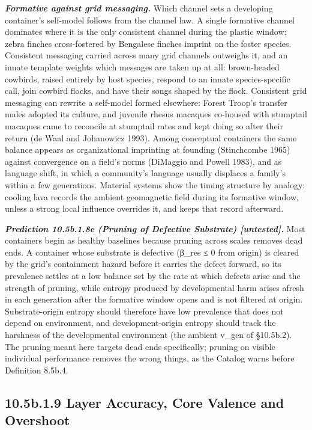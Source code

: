 \documentclass[
]{article}
\begin{document}
\emph{\textbf{Formative against grid messaging.}} Which channel sets a
developing container's self-model follows from the channel law. A single
formative channel dominates where it is the only consistent channel
during the plastic window: zebra finches cross-fostered by Bengalese
finches imprint on the foster species. Consistent messaging carried
across many grid channels outweighs it, and an innate template weights
which messages are taken up at all: brown-headed cowbirds, raised
entirely by host species, respond to an innate species-specific call,
join cowbird flocks, and have their songs shaped by the flock.
Consistent grid messaging can rewrite a self-model formed elsewhere:
Forest Troop's transfer males adopted its culture, and juvenile rhesus
macaques co-housed with stumptail macaques came to reconcile at
stumptail rates and kept doing so after their return (de Waal and
Johanowicz 1993). Among conceptual containers the same balance appears
as organizational imprinting at founding (Stinchcombe 1965) against
convergence on a field's norms (DiMaggio and Powell 1983), and as
language shift, in which a community's language usually displaces a
family's within a few generations. Material systems show the timing
structure by analogy: cooling lava records the ambient geomagnetic field
during its formative window, unless a strong local influence overrides
it, and keeps that record afterward.

\emph{\textbf{Prediction 10.5b.1.8e (Pruning of Defective Substrate)
{[}untested{]}.}} Most containers begin as healthy baselines because
pruning across scales removes dead ends. A container whose substrate is
defective (β\_res ≤ 0 from origin) is cleared by the grid's containment
hazard before it carries the defect forward, so its prevalence settles
at a low balance set by the rate at which defects arise and the strength
of pruning, while entropy produced by developmental harm arises afresh
in each generation after the formative window opens and is not filtered
at origin. Substrate-origin entropy should therefore have low prevalence
that does not depend on environment, and development-origin entropy
should track the harshness of the developmental environment (the ambient
v\_gen of §10.5b.2). The pruning meant here targets dead ends
specifically; pruning on visible individual performance removes the
wrong things, as the Catalog warns before Definition 8.5b.4.

\hypertarget{b.1.9-layer-accuracy-core-valence-and-overshoot}{%
\subsection{10.5b.1.9 Layer Accuracy, Core Valence and
Overshoot}\label{b.1.9-layer-accuracy-core-valence-and-overshoot}}
\end{document}
